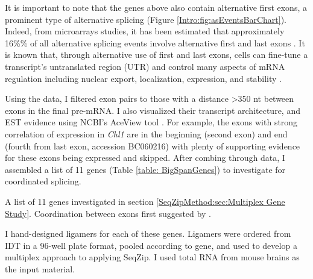   It is important to note that the genes above also contain alternative first exons, a prominent type of alternative splicing (Figure \ref{Intro:fig:asEventsBarChart}). Indeed, from microarrays studies, it has been estimated that approximately 16\%\% of all alternative splicing events involve alternative first and last exons \citep{Bingham2008}. It is known that, through alternative use of first and last exons, cells can fine-tune a transcript's untranslated region (UTR) and control many aspects of mRNA regulation including nuclear export, localization, expression, and stability \citep{Hughes2006}.

  Using the \citet{Fagnani2007} data, I filtered exon pairs to those with a distance >350 nt between exons in the final pre-mRNA. I also visualized their transcript architecture, and EST evidence using NCBI's AceView tool \citep{Thierry-Mieg2006}. For example, the exons with strong correlation of expression in \textit{Chl1} are in the beginning (second exon) and end (fourth from last exon, accession BC060216) with plenty of supporting evidence for these exons being expressed and skipped. After combing through \citep{Fagnani2007} data, I assembled a list of 11 genes (Table \ref{table: BigSpanGenes}) to investigate for coordinated splicing.

  \begin{table} %
    \caption[Mouse genes with large sequence between suggested coordinated cassette exons]
      {
        A list of 11 genes investigated in section \ref{SeqZipMethod:sec:Multiplex Gene Study}. Coordination between exons first suggested by \citep{Fagnani2007}.
        }
    \label{table: BigSpanGenes}
    
    \end{table}

  I hand-designed ligamers for each of these genes. Ligamers were ordered from IDT in a 96-well plate format, pooled according to gene, and used to develop a multiplex approach to applying SeqZip. I used total RNA from mouse brains as the input material.

